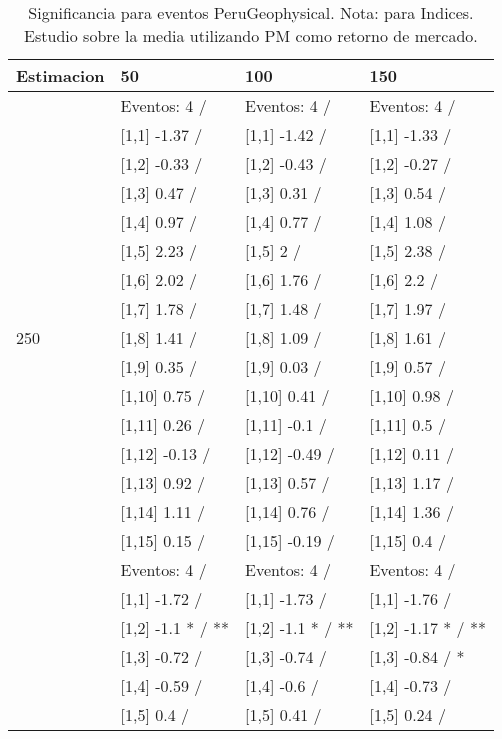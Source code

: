 \begin{table}

\caption{Significancia para eventos PeruGeophysical. Nota: para Indices. Estudio sobre la media utilizando PM como retorno de mercado.}
\centering
\begin{tabular}[t]{llll}
\toprule
Estimacion & 50 & 100 & 150\\
\midrule
 & Eventos:  4 / & Eventos:  4 / & Eventos:  4 /\\
 & {}[1,1] -1.37  / & {}[1,1] -1.42  / & {}[1,1] -1.33  /\\
 & {}[1,2] -0.33  / & {}[1,2] -0.43  / & {}[1,2] -0.27  /\\
 & {}[1,3] 0.47  / & {}[1,3] 0.31  / & {}[1,3] 0.54  /\\
 & {}[1,4] 0.97  / & {}[1,4] 0.77  / & {}[1,4] 1.08  /\\
\addlinespace
 & {}[1,5] 2.23  / & {}[1,5] 2  / & {}[1,5] 2.38  /\\
 & {}[1,6] 2.02  / & {}[1,6] 1.76  / & {}[1,6] 2.2  /\\
 & {}[1,7] 1.78  / & {}[1,7] 1.48  / & {}[1,7] 1.97  /\\
250 & {}[1,8] 1.41  / & {}[1,8] 1.09  / & {}[1,8] 1.61  /\\
 & {}[1,9] 0.35  / & {}[1,9] 0.03  / & {}[1,9] 0.57  /\\
\addlinespace
 & {}[1,10] 0.75  / & {}[1,10] 0.41  / & {}[1,10] 0.98  /\\
 & {}[1,11] 0.26  / & {}[1,11] -0.1  / & {}[1,11] 0.5  /\\
 & {}[1,12] -0.13  / & {}[1,12] -0.49  / & {}[1,12] 0.11  /\\
 & {}[1,13] 0.92  / & {}[1,13] 0.57  / & {}[1,13] 1.17  /\\
 & {}[1,14] 1.11  / & {}[1,14] 0.76  / & {}[1,14] 1.36  /\\
\addlinespace
 & {}[1,15] 0.15  / & {}[1,15] -0.19  / & {}[1,15] 0.4  /\\
 & Eventos:  4 / & Eventos:  4 / & Eventos:  4 /\\
 & {}[1,1] -1.72  / & {}[1,1] -1.73  / & {}[1,1] -1.76  /\\
 & {}[1,2] -1.1 * / ** & {}[1,2] -1.1 * / ** & {}[1,2] -1.17 * / **\\
 & {}[1,3] -0.72  / & {}[1,3] -0.74  / & {}[1,3] -0.84  / *\\
\addlinespace
 & {}[1,4] -0.59  / & {}[1,4] -0.6  / & {}[1,4] -0.73  /\\
 & {}[1,5] 0.4  / & {}[1,5] 0.41  / & {}[1,5] 0.24  /\\

\end{tabular}
\end{table}
